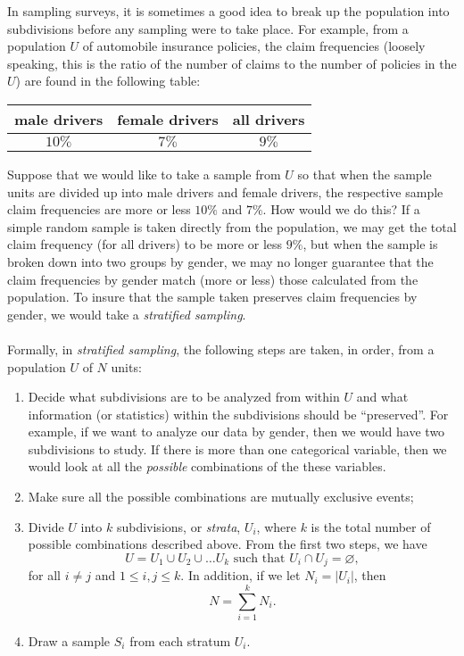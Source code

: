 \documentclass[12pt]{article}
\begin{document}

In sampling surveys, it is sometimes a good idea to break up the
population into subdivisions before any sampling were to take place.
For example, from a population $U$ of automobile insurance policies,
the claim frequencies (loosely speaking, this is the ratio of the
number of claims to the number of policies in the $U$) are found in
the following table:
\begin{center}
\begin{tabular}{|c|c|c|}
\hline
male drivers & female drivers & all drivers \\
\hline $10\%$ & $7\%$ & $9\%$ \\
\hline
\end{tabular}
\end{center}
Suppose that we would like to take a sample from $U$ so that when
the sample units are divided up into male drivers and female
drivers, the respective sample claim frequencies are more or less
$10\%$ and $7\%$.  How would we do this?  If a simple random sample
is taken directly from the population, we may get the total claim
frequency (for all drivers) to be more or less $9\%$, but when the
sample is broken down into two groups by gender, we may no longer
guarantee that the claim frequencies by gender match (more or less)
those calculated from the population.  To insure that the sample
taken preserves claim frequencies by gender, we would take a
\emph{stratified sampling}.
\\\\
Formally, in \emph{stratified sampling}, the following steps are
taken, in order, from a population $U$ of $N$ units:
\begin{enumerate}
\item Decide what subdivisions are to be analyzed from
within $U$ and what information (or statistics) within the
subdivisions should be ``preserved''.  For example, if we want to
analyze our data by gender, then we would have two subdivisions to
study. If there is more than one categorical variable, then we would
look at all the \emph{possible} combinations of the these variables.
\item Make sure all the possible combinations are mutually exclusive
events;
\item Divide $U$ into $k$ subdivisions, or \emph{strata}, $U_i$,
where $k$ is the total number of possible combinations described
above.  From the first two steps, we have $$U=U_1\cup U_2\cup\ldots
U_k \mbox{ such that }U_i\cap U_j=\varnothing,$$ for all $i\neq j$
and $1\leq i,j\leq k$.  In addition, if we let $N_i=\lvert U_i
\rvert$, then
$$N=\sum_{i=1}^{k}N_i.$$
\item Draw a sample $S_i$ from each stratum $U_i$.
\end{enumerate}
\end{document}
